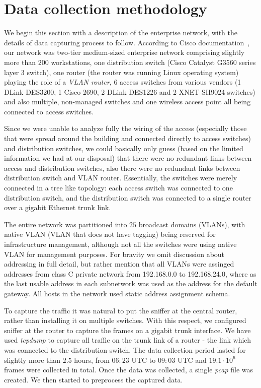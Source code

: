 \section{Data collection methodology}
\label{section:experiments}

We begin this section with a description of the enterprise network,
with the details of data capturing process to follow. According to 
Cisco documentation~\cite{cisco:ccent}, our network was two-tier 
medium-sized enterprise network comprising slightly more than 
$200$ workstations, one distribution switch (Cisco Catalyst 
G3560 series layer 3 switch), one router (the router was 
running Linux operating system) playing the role of a 
{\em VLAN router}, $6$ access switches from various vendors (1 DLink DES3200, 
1 Cisco 2690, 2 DLink DES1226 and 2 XNET SH9024 switches)
and also multiple, non-managed switches and one wireless 
access point all being connected to access switches.


Since we were unable to analyze fully the wiring of the access (especially those that were spread around the building and connected 
directly to access switches) and distribution switches, we could basically only guess (based on the limited information we had at our 
disposal) that there were no redundant links between access and distribution switches, also there were no redundant links between 
distribution switch and VLAN router. Essentially, the switches were merely connected in a tree like topology: each access switch was connected 
to one distribution switch, and the distribution switch was connected to a single router over a gigabit Ethernet trunk link. 

The entire network was partitioned into $25$ broadcast domains (VLANs), with native VLAN (VLAN that does not have tagging) being reserved 
for infrastructure management, although not all the switches were using native VLAN for management purposes. For bravity we omit discussion
about addressing in full detail, but rather mention that all VLANs were assinged addresses from class C private network from 
192.168.0.0 to 192.168.24.0, where as the last usable address in each subnetwork was used as the address for the default gateway. 
All hosts in the network used static address assignment schema.

To capture the traffic it was natural to put the sniffer at 
the central router, rather than installing it on multiple 
switches. With this respect, we configured sniffer at the 
router to capture the frames on a gigabit trunk interface.
We have used {\em tcpdump} to capture all traffic on the trunk 
link of a router - the link which was connected to 
the distribution switch. The data collection period 
lasted for slightly more than $2.5$ hours, from 
$06:23$ UTC to $09:03$ UTC and $19.1 \cdot 10^6$ 
frames were collected in total. Once the data was 
collected, a single {\em pcap} file was created. 
We then started to preprocess the captured data.
